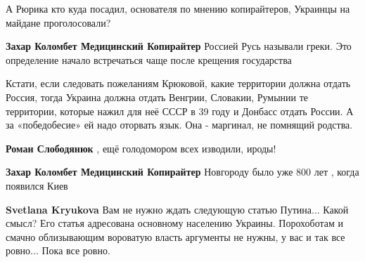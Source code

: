 \begin{itemize}
\begin{itemize}
А Рюрика кто куда посадил, основателя по мнению копирайтеров,
Украинцы на майдане проголосовали?🤣🤣🤣

 
\textbf{Захар Коломбет Медицинский Копирайтер} Россией Русь называли греки. Это определение начало встречаться чаще после крещения государства

 
Кстати, если следовать пожеланиям Крюковой, какие территории должна отдать Россия, тогда Украина должна отдать Венгрии, Словакии, Румынии те территории, которые нажил для неё СССР в 39 году и Донбасс отдать России. А за «победобесие» ей надо оторвать язык. Она - маргинал, не помнящий родства.

 
\textbf{Роман Слободянюк} , ещё голодомором всех изводили, ироды!

 
\textbf{Захар Коломбет Медицинский Копирайтер} Новгороду было уже 800 лет , когда появился Киев

 
\textbf{Svetlana Kryukova} Вам не нужно ждать следующую статью Путина... Какой смысл? Его статья адресована основному населению Украины. Порохоботам и смачно облизывающим вороватую власть аргументы не нужны, у вас и так все ровно... Пока все ровно.

 

\end{itemize}
\end{itemize}
